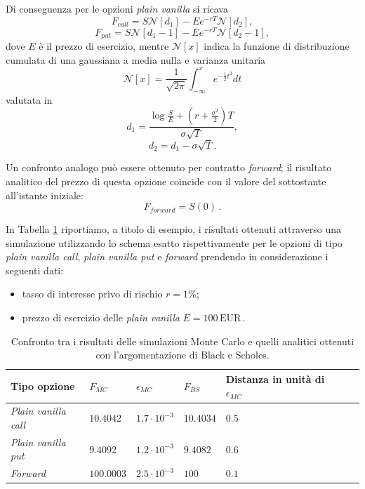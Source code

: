 Di conseguenza per le opzioni \textit{plain vanilla} si ricava
\begin{equation}
    F_{call} = S \mathcal{N}[d_{1}] - E e^{- r T} \mathcal{N}[d_{2}],
    \label{eq:BS_call}
\end{equation}
\begin{equation}
    F_{put} = S \mathcal{N}[d_{1}-1] - E e^{- r T} \mathcal{N}[d_{2}-1],
    \label{eq:BS_put}
\end{equation}
dove $E$ è il prezzo di esercizio, mentre $\mathcal{N}[x]$ indica la funzione di distribuzione cumulata di una gaussiana a media nulla e varianza unitaria
\begin{equation}
    \mathcal{N}[x] = \frac{1}{\sqrt{2\pi}} \int_{-\infty}^x{e^{-\frac{1}{2} t^2} dt}
    \label{eq:cumulative_gaussian}
\end{equation}
valutata in
\begin{equation}
    d_{1}=\frac{\log{\frac{S}{E}} + (r+\frac{\sigma ^2}{2}) T}{\sigma \sqrt{T}},
\end{equation}
\begin{equation}
    d_{2}=d_{1}- \sigma \sqrt{T}.
\end{equation}

Un confronto analogo può essere ottenuto per contratto \textit{forward}; il risultato analitico del prezzo di questa opzione coincide con il valore del sottostante all'istante iniziale:
\begin{equation}
    F_{forward}=S(0)\, .
\end{equation}

In Tabella \ref{tab:BS-MC} riportiamo, a titolo di esempio, i risultati ottenuti attraverso una simulazione utilizzando lo schema esatto rispettivamente per le opzioni di tipo \textit{plain vanilla call}, \textit{plain vanilla put} e \textit{forward} prendendo in considerazione i seguenti dati:
\begin{itemize}
    \item tasso di interesse privo di rischio $r=1\%$;
    \item prezzo di esercizio delle \textit{plain vanilla} $E=100\,\text{EUR}$\,.
\end{itemize}

\begin{table}[t]
\small
\centering
\begin{tabular}{|l||l|l|l|l|l|l|}
\hline
\textbf{Tipo opzione} & $F_{MC}$ & $\epsilon_{MC}$ & $F_{BS}$ & Distanza in unità di $\epsilon_{MC}$ \\
\hline \hline
\textit{Plain vanilla call} & $10.4042$ & $1.7 \cdot 10^{-3}$ &
$10.4034$ & $0.5$\\ \hline
\textit{Plain vanilla put} & $9.4092$ & $1.2 \cdot 10^{-3}$ & $9.4082$ & $0.6$\\ \hline
\textit{Forward} & $100.0003$ & $2.5 \cdot 10^{-3}$ & $100$ & $0.1$\\ \hline
\end{tabular}
\caption{Confronto tra i risultati delle simulazioni Monte Carlo e quelli analitici ottenuti con l'argomentazione di Black e Scholes.}
\label{tab:BS-MC}
\end{table}


